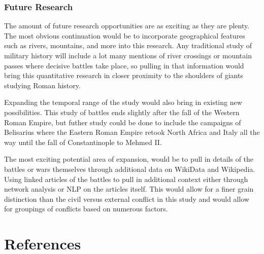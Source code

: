 \documentclass[
  letterpaper,
  DIV=11,
  numbers=noendperiod]{scrartcl}
\begin{document}
\subsubsection{Future Research}\label{future-research}

The amount of future research opportunities are as exciting as they are
plenty. The most obvious continuation would be to incorporate
geographical features such as rivers, mountains, and more into this
research. Any traditional study of military history will include a lot
many mentions of river crossings or mountain passes where decisive
battles take place, so pulling in that information would bring this
quantitative research in closer proximity to the shoulders of giants
studying Roman history.

Expanding the temporal range of the study would also bring in existing
new possibilities. This study of battles ends slightly after the fall of
the Western Roman Empire, but futher study could be done to include the
campaigns of Belisarius where the Eastern Roman Empire retook North
Africa and Italy all the way until the fall of Constantinople to Mehmed
II.

The most exciting potential area of expansion, would be to pull in
details of the battles or wars themselves through additional data on
WikiData and Wikipedia. Using linked articles of the battles to pull in
additional context either through network analysis or NLP on the
articles itself. This would allow for a finer grain distinction than the
civil versus external conflict in this study and would allow for
groupings of conflicts based on numerous factors.

\section*{References}\label{references}
\end{document}
